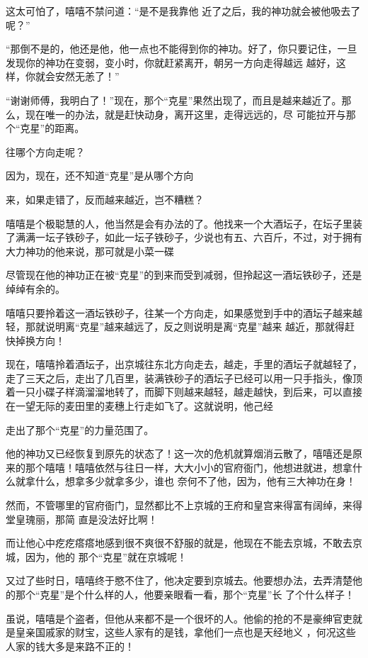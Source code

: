 \documentclass{article}
\begin{document}
这太可怕了，嘻嘻不禁问道：“是不是我靠他
近了之后，我的神功就会被他吸去了呢？” 

“那倒不是的，他还是他，他一点也不能得到你的神功。好了，你只要记住，一旦发现你的神功在变弱，变小时，你就赶紧离开，朝另一方向走得越远
越好，这样，你就会安然无恙了！” 

“谢谢师傅，我明白了！”现在，那个“克星”果然出现了，而且是越来越近了。那么，现在唯一的办法，就是赶快动身，离开这里，走得远远的，尽
可能拉开与那个“克星”的距离。 


往哪个方向走呢？ 

因为，现在，还不知道“克星”是从哪个方向
\newpage

来，如果走错了，反而越来越近，岂不糟糕？ 

嘻嘻是个极聪慧的人，他当然是会有办法的了。他找来一个大酒坛子，在坛子里装了满满一坛子铁砂子，如此一坛子铁砂子，少说也有五、六百斤，不过，对于拥有大力神功的他来说，那可就是小菜一碟

尽管现在他的神功正在被“克星”的到来而受到减弱，但拎起这一酒坛铁砂子，还是绰绰有余的。

嘻嘻只要拎着这一酒坛铁砂子，往某一个方向走，如果感觉到手中的酒坛子越来越轻，那就说明离“克星”越来越远了，反之则说明是离“克星”越来
越近，那就得赶快掉换方向！ 

现在，嘻嘻拎着酒坛子，出京城往东北方向走去，越走，手里的酒坛子就越轻了，走了三天之后，走出了几百里，装满铁砂子的酒坛子已经可以用一只手指头，像顶着一只小碟子样滴溜溜地转了，而脚下则越来越轻，越走越快，到后来，可以直接在一望无际的麦田里的麦穗上行走如飞了。这就说明，他己经
\newpage

走出了那个“克星”的力量范围了。 

他的神功又已经恢复到原先的状态了！这一次的危机就算烟消云散了，嘻嘻还是原来的那个嘻嘻！嘻嘻依然与往日一样，大大小小的官府衙门，他想进就进，想拿什么就拿什么，想拿多少就拿多少，谁也
奈何不了他，因为，他有三大神功在身！ 

然而，不管哪里的官府衙门，显然都比不上京城的王府和皇宫来得富有阔绰，来得堂皇瑰丽，那简
直是没法好比啊！ 

而让他心中疙疙瘩瘩地感到很不爽很不舒服的就是，他现在不能去京城，不敢去京城，因为，他的
那个“克星”就在京城呢！ 

又过了些时日，嘻嘻终于愍不住了，他决定要到京城去。他要想办法，去弄清楚他的那个“克星”是个什么样的人，他要亲眼看一看，那个“克星”长
了个什么样子！ 

\newpage

虽说，嘻嘻是个盗者，但他从来都不是一个很坏的人。他偷的抢的不是豪绅官吏就是皇亲国戚家的财宝，这些人家有的是钱，拿他们一点也是天经地义
，何况这些人家的钱大多是来路不正的！ 
\end{document}
